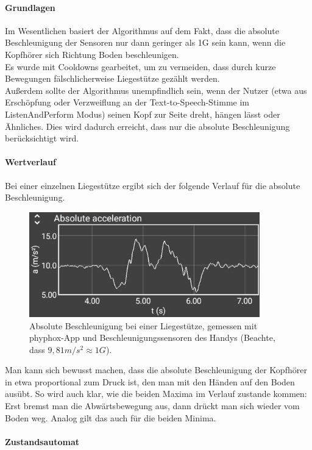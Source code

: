 \documentclass[a4paper,12pt]{article}
\begin{document}
\paragraph{Grundlagen}
Im Wesentlichen basiert der Algorithmus auf dem Fakt, dass die absolute Beschleunigung der Sensoren nur dann geringer als 1G sein kann, wenn die Kopfhörer sich Richtung Boden beschleunigen.\\
Es wurde mit Cooldowns gearbeitet, um zu vermeiden, dass durch kurze Bewegungen fälschlicherweise Liegestütze gezählt werden.\\
Außerdem sollte der Algorithmus unempfindlich sein, wenn der Nutzer (etwa aus Erschöpfung oder Verzweiflung an der Text-to-Speech-Stimme im ListenAndPerform Modus) seinen Kopf zur Seite dreht, hängen lässt oder Ähnliches. Dies wird dadurch erreicht, dass nur die absolute Beschleunigung berücksichtigt wird.
\paragraph{Wertverlauf}
Bei einer einzelnen Liegestütze ergibt sich der folgende Verlauf für die absolute Beschleunigung.\\
\begin{figure}[ht]
	\centering
\includegraphics[width = 10cm]{bilder/pushup_sample.jpg}
	\caption{Absolute Beschleunigung bei einer Liegestütze, gemessen mit phyphox-App und Beschleunigungssensoren des Handys (Beachte, dass $9,81 m/s^2 \approx 1 G$).}
\end{figure} 
Man kann sich bewusst machen, dass die absolute Beschleunigung der Kopfhörer in etwa proportional zum Druck ist, den man mit den Händen auf den Boden ausübt. So wird auch klar, wie die beiden Maxima im Verlauf zustande kommen: Erst bremst man die Abwärtsbewegung aus, dann drückt man sich wieder vom Boden weg. Analog gilt das auch für die beiden Minima. 
\paragraph{Zustandsautomat}

\end{document}
